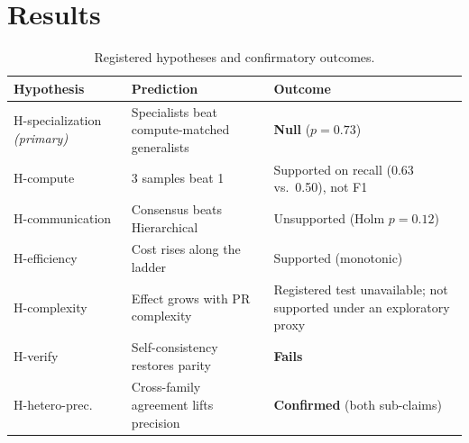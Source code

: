 \documentclass[conference]{IEEEtran}
\begin{document}
\section{Results}
\label{sec:results}

\begin{table}[t]
\caption{Registered hypotheses and confirmatory outcomes.}
\label{tab:hyp}
\centering
\footnotesize
\begin{tabular}{@{}p{1.55cm}p{2.6cm}p{3.0cm}@{}}
\toprule
\textbf{Hypothesis} & \textbf{Prediction} & \textbf{Outcome} \\
\midrule
H-specialization \emph{(primary)} & Specialists beat compute-matched generalists & \textbf{Null} ($p{=}0.73$) \\
H-compute        & 3 samples beat 1 & Supported on recall (0.63 vs.\ 0.50), not F1 \\
H-communication  & Consensus beats Hierarchical & Unsupported (Holm $p{=}0.12$) \\
H-efficiency     & Cost rises along the ladder & Supported (monotonic) \\
H-complexity     & Effect grows with PR complexity & Registered test unavailable; not supported under an exploratory proxy \\
H-verify         & Self-consistency restores parity & \textbf{Fails} \\
H-hetero-prec.\  & Cross-family agreement lifts precision & \textbf{Confirmed} (both sub-claims) \\
\bottomrule
\end{tabular}
\end{table}
\end{document}
